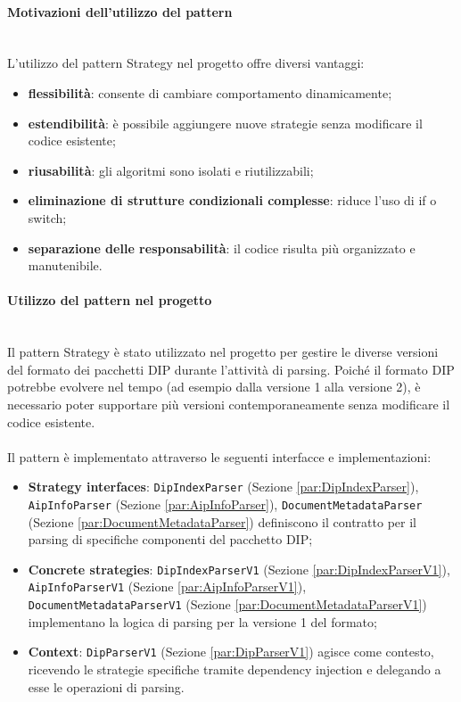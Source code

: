 \documentclass[a4paper,12pt]{article}
\begin{document}
{{{                \paragraph{Motivazioni dell’utilizzo del pattern}\mbox{}\\
                L’utilizzo del pattern Strategy nel progetto offre diversi vantaggi:
                \begin{itemize}
                    \item \textbf{flessibilità}: consente di cambiare comportamento dinamicamente;
                    \item \textbf{estendibilità}: è possibile aggiungere nuove strategie senza modificare il codice esistente;
                    \item \textbf{riusabilità}: gli algoritmi sono isolati e riutilizzabili;
                    \item \textbf{eliminazione di strutture condizionali complesse}: riduce l’uso di if o switch;
                    \item \textbf{separazione delle responsabilità}: il codice risulta più organizzato e manutenibile.
                \end{itemize}
                
                \paragraph{Utilizzo del pattern nel progetto}\mbox{}\\
                Il pattern Strategy è stato utilizzato nel progetto per gestire le diverse versioni del formato dei pacchetti DIP durante l'attività di parsing. Poiché il formato DIP potrebbe evolvere nel tempo (ad esempio dalla versione 1 alla versione 2), è necessario poter supportare più versioni contemporaneamente senza modificare il codice esistente.\\
                \\
                Il pattern è implementato attraverso le seguenti interfacce e implementazioni:
                \begin{itemize}
                    \item \textbf{Strategy interfaces}: \texttt{DipIndexParser} (Sezione \ref{par:DipIndexParser}), \texttt{AipInfoParser} (Sezione \ref{par:AipInfoParser}), \texttt{DocumentMetadataParser} (Sezione \ref{par:DocumentMetadataParser}) definiscono il contratto per il parsing di specifiche componenti del pacchetto DIP;
                    \item \textbf{Concrete strategies}: \texttt{DipIndexParserV1} (Sezione \ref{par:DipIndexParserV1}), \texttt{AipInfoParserV1} (Sezione \ref{par:AipInfoParserV1}), \texttt{DocumentMetadataParserV1} (Sezione \ref{par:DocumentMetadataParserV1}) implementano la logica di parsing per la versione 1 del formato;
                    \item \textbf{Context}: \texttt{DipParserV1} (Sezione \ref{par:DipParserV1}) agisce come contesto, ricevendo le strategie specifiche tramite dependency injection e delegando a esse le operazioni di parsing.
                \end{itemize}
                
}}}
\end{document}
